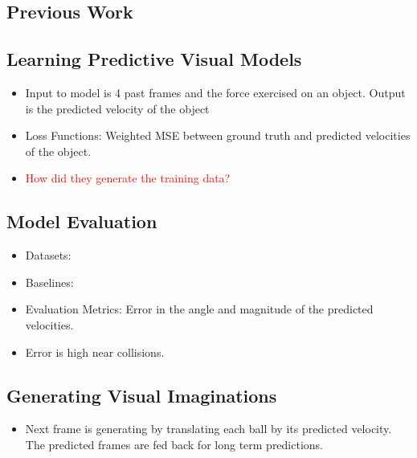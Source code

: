 \documentclass{article}
\begin{document}
    \subsection{Previous Work}\label{subsec:Learning_Visual_Predictive_Models_of_Physics_for_Playing_Billiards:previous-work}

    \subsection{Learning Predictive Visual Models}\label{subsec:Learning_Visual_Predictive_Models_of_Physics_for_Playing_Billiards:predictive-visual-models}
    \begin{itemize}
        \item Input to model is 4 past frames and the force exercised on an object.
        Output is the predicted velocity of the object
        \item Loss Functions: Weighted MSE between ground truth and predicted velocities of the object.
        \item \textcolor{red}{How did they generate the training data?}
    \end{itemize}

    \subsection{Model Evaluation}\label{subsec:Learning_Visual_Predictive_Models_of_Physics_for_Playing_Billiards:model-evaluation}
    \begin{itemize}
        \item Datasets:
        \item Baselines:
        \item Evaluation Metrics: Error in the angle and magnitude of the predicted velocities.
        \item Error is high near collisions.
    \end{itemize}

    \subsection{Generating Visual Imaginations}\label{subsec:Learning_Visual_Predictive_Models_of_Physics_for_Playing_Billiards:visual-imaginations}
    \begin{itemize}
        \item Next frame is generating by translating each ball by its predicted velocity.
        The predicted frames are fed back for long term predictions.
    \end{itemize}
\end{document}
